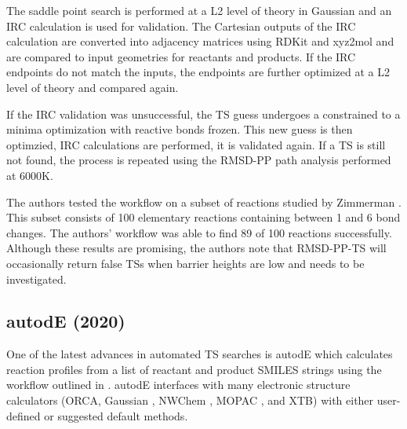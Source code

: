 \documentclass[preprint, 11pt]{elsarticle} %
\begin{document}
The saddle point search is performed at a L2 level of theory in Gaussian \cite{Gaussian:2009} and an IRC calculation is used for validation.
The Cartesian outputs of the IRC calculation are converted into adjacency matrices using RDKit \cite{RDKit:2018} and xyz2mol \cite{xyz2mol} and are compared to input geometries for reactants and products.
If the IRC endpoints do not match the inputs, the endpoints are further optimized at a L2 level of theory and compared again. 

If the IRC validation was unsuccessful, the TS guess undergoes a constrained to a minima optimization with reactive bonds frozen.
This new guess is then optimzied, IRC calculations are performed, it is validated again.
If a TS is still not found, the process is repeated using the RMSD-PP path analysis performed at 6000K.

The authors tested the workflow on a subset of reactions studied by Zimmerman \cite{Zimmerman:2013jctc,Zimmerman:2015jcc}.
This subset consists of 100 elementary reactions containing between 1 and 6 bond changes.
The authors' workflow was able to find 89 of 100 reactions successfully.
Although these results are promising, the authors note that RMSD-PP-TS will occasionally return false TSs when barrier heights are low and needs to be investigated.



\subsection{autodE (2020)}

One of the latest advances in automated TS searches is autodE \cite{young:2020} which calculates reaction profiles from a list of reactant and product SMILES strings using the workflow outlined in .
autodE interfaces with many electronic structure calculators (ORCA, Gaussian \cite{Gaussian:2009}, NWChem \cite{NWChem:2020}, MOPAC \cite{mopac:2016}, and XTB) \cite{xtb:2020} with either user-defined or suggested default methods.
\end{document}
